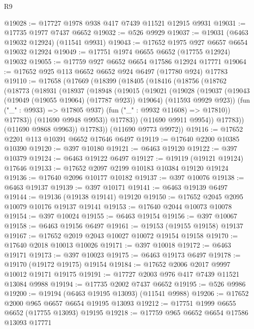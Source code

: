 \begin{lexlean}{R9}
\begin{coremodule}
@19028 := @17727 @1978 @938 @417 @7439 @11521 @12915 @9931
@19031 := @17735 @1977 @7437 @6652
@19032 := @526 @9929
@19037 := @19031 (@6463 @19032 @12924) (@11541 @9931)
@19043 := @17652 @1975 @927 @6657 @6654 @19032 @12924
@19049 := @17751 @1974 @6655 @6652 (@17755 @12924) @19032
@19055 := @17759 @927 @6652 @6654 @17586 @12924 @17771
@19064 := @17652 @925 @113 @6652 @6652 @924 @6497 (@17780 @924) @17783
@19110 := @17658
    (@17669
      (@18399
        (@18405
          (@18416
            (@18756
              (@18762
                (@18773
                  (@18931
                    (@18937
                      (@18948
                        (@19015
                          (@19021
                            (@19028
                              (@19037
                                (@19043 (@19049 (@19055 @19064) (@17787 @923)) @19064)
                                (@11593 @9929 @923))
                              (fun ("_" : @9933) => @17805 @937)
                              (fun ("_" : @9932 @11608) => @17810))
                            @17783))
                        (@11690 @9948 @9953))
                      @17783))
                  (@11690 @9911 @9954))
                @17783))
            (@11690 @9868 @9963))
          @17783))
      (@11690 @9773 @9972))
@19116 := @17652 @2201 @113 @10391 @6652 @17646 @6497
@19119 := @17640 @2200 @10385 @10390
@19120 := @397 @10180
@19121 := @6463 @19120
@19122 := @397 @10379
@19124 := @6463 @19122 @6497
@19127 := @19119 (@19121 @19124) @17646
@19133 := @17652 @2097 @2199 @10183 @10384 @19120 @19124
@19136 := @17640 @2096 @10177 @10182
@19137 := @397 @10076
@19138 := @6463 @19137
@19139 := @397 @10171
@19141 := @6463 @19139 @6497
@19144 := @19136 (@19138 @19141) @19120
@19150 := @17652 @2045 @2095 @10079 @10176 @19137 @19141
@19153 := @17640 @2044 @10073 @10078
@19154 := @397 @10024
@19155 := @6463 @19154
@19156 := @397 @10067
@19158 := @6463 @19156 @6497
@19161 := @19153 (@19155 @19158) @19137
@19167 := @17652 @2019 @2043 @10027 @10072 @19154 @19158
@19170 := @17640 @2018 @10013 @10026
@19171 := @397 @10018
@19172 := @6463 @19171
@19173 := @397 @10023
@19175 := @6463 @19173 @6497
@19178 := @19170 (@19172 @19175) @19154
@19184 := @17652 @2006 @2017 @9997 @10012 @19171 @19175
@19191 := @17727 @2003 @976 @417 @7439 @11521 @13084 @9988
@19194 := @17735 @2002 @7437 @6652
@19195 := @526 @9986
@19200 := @19194 (@6463 @19195 @13093) (@11541 @9988)
@19206 := @17652 @2000 @965 @6657 @6654 @19195 @13093
@19212 := @17751 @1999 @6655 @6652 (@17755 @13093) @19195
@19218 := @17759 @965 @6652 @6654 @17586 @13093 @17771

\end{coremodule}
\end{lexlean}
